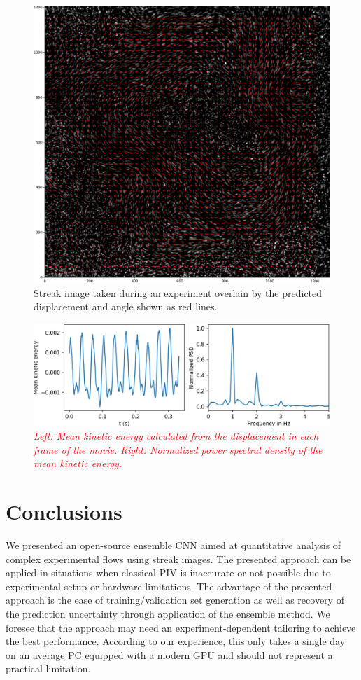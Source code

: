 \documentclass{svjour3}                     %
\newcommand{\new}[1]{\textit{\textcolor{red}{#1}}}
\begin{document}
\begin{figure}
\includegraphics[width=\textwidth]{figs/figure9.png}
\caption{Streak image taken during an experiment overlain by the predicted displacement and angle shown as red lines.}
\label{fig:fig10}
\end{figure}


\begin{figure}
	\includegraphics[width=\textwidth]{figs/figure10.png}
	\caption{\new{Left: Mean kinetic energy calculated from the displacement in each frame of the movie. Right: Normalized power spectral density of the mean kinetic energy.}}
	\label{fig:fig10}
\end{figure}


\section{Conclusions}

We presented an open-source ensemble CNN aimed at quantitative analysis of complex experimental flows using streak images. The presented approach can be applied in situations when classical PIV is inaccurate or not possible due to experimental setup or hardware limitations. The advantage of the presented approach is the ease of training/validation set generation as well as recovery of the prediction uncertainty through application of the ensemble method. We foresee that the approach may need an experiment-dependent tailoring to achieve the best performance. According to our experience, this only takes a single day on an average PC equipped with a modern GPU and should not represent a practical limitation.
\end{document}
